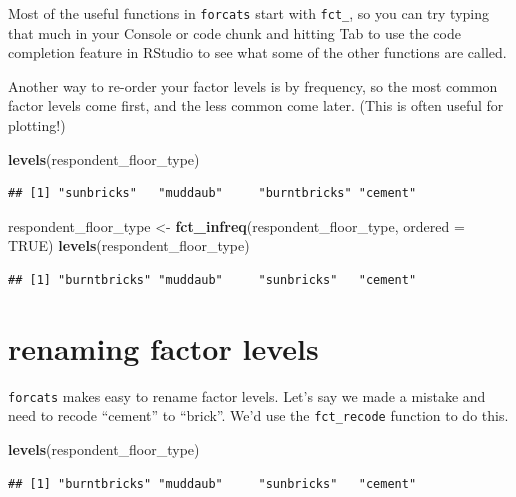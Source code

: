 \documentclass[]{book}
\newenvironment{Shaded}{\begin{snugshade}}{\end{snugshade}}
\newcommand{\KeywordTok}[1]{\textcolor[rgb]{0.13,0.29,0.53}{\textbf{#1}}}
\newcommand{\DataTypeTok}[1]{\textcolor[rgb]{0.13,0.29,0.53}{#1}}
\newcommand{\StringTok}[1]{\textcolor[rgb]{0.31,0.60,0.02}{#1}}
\newcommand{\OtherTok}[1]{\textcolor[rgb]{0.56,0.35,0.01}{#1}}
\newcommand{\NormalTok}[1]{#1}
\begin{document}
Most of the useful functions in \texttt{forcats} start with
\texttt{fct\_}, so you can try typing that much in your Console or code
chunk and hitting Tab to use the code completion feature in RStudio to
see what some of the other functions are called.

Another way to re-order your factor levels is by frequency, so the most
common factor levels come first, and the less common come later. (This
is often useful for plotting!)

\begin{Shaded}
\begin{Highlighting}[]
\KeywordTok{levels}\NormalTok{(respondent_floor_type)}
\end{Highlighting}
\end{Shaded}

\begin{verbatim}
## [1] "sunbricks"   "muddaub"     "burntbricks" "cement"
\end{verbatim}

\begin{Shaded}
\begin{Highlighting}[]
\NormalTok{respondent_floor_type <-}\StringTok{ }\KeywordTok{fct_infreq}\NormalTok{(respondent_floor_type, }\DataTypeTok{ordered =} \OtherTok{TRUE}\NormalTok{)}
\KeywordTok{levels}\NormalTok{(respondent_floor_type)}
\end{Highlighting}
\end{Shaded}

\begin{verbatim}
## [1] "burntbricks" "muddaub"     "sunbricks"   "cement"
\end{verbatim}

\section{renaming factor levels}\label{renaming-factor-levels}

\texttt{forcats} makes easy to rename factor levels. Let's say we made a
mistake and need to recode ``cement'' to ``brick''. We'd use the
\texttt{fct\_recode} function to do this.

\begin{Shaded}
\begin{Highlighting}[]
\KeywordTok{levels}\NormalTok{(respondent_floor_type)}
\end{Highlighting}
\end{Shaded}

\begin{verbatim}
## [1] "burntbricks" "muddaub"     "sunbricks"   "cement"
\end{verbatim}
\end{document}
